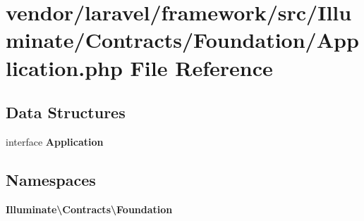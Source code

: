 \section{vendor/laravel/framework/src/\+Illuminate/\+Contracts/\+Foundation/\+Application.php File Reference}
\label{laravel_2framework_2src_2_illuminate_2_contracts_2_foundation_2_application_8php}
\subsection*{Data Structures}
\begin{DoxyCompactItemize}
\item 
interface {\bf Application}
\end{DoxyCompactItemize}
\subsection*{Namespaces}
\begin{DoxyCompactItemize}
\item 
 {\bf Illuminate\textbackslash{}\+Contracts\textbackslash{}\+Foundation}
\end{DoxyCompactItemize}
